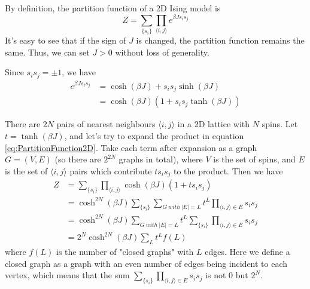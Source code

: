 \documentclass[11pt]{article}
\begin{document}
	By definition, the partition function of a 2D Ising model is
	\begin{equation} \label{eq:PartitionFunction2D}
		Z = \sum_{\{s_i\}} \prod_{\langle i,j \rangle} e^{\beta J s_i s_j}
	\end{equation}
	It's easy to see that if the sign of $J$ is changed, the partition function remains the same.
	Thus, we can set $J > 0$ without loss of generality.

	Since $s_i s_j = \pm 1$, we have
	\begin{equation} \label{eq:PartitionFunction2DTransformingTrick}
		\begin{aligned}
			e^{\beta J s_i s_j} &= \cosh(\beta J) + s_i s_j \sinh(\beta J) \\
			&= \cosh(\beta J)(1 + s_i s_j \tanh(\beta J))
		\end{aligned}
	\end{equation}

	There are $2N$ pairs of nearest neighbours $\langle i,j \rangle$ in a 2D lattice with $N$ spins.
	Let $t = \tanh(\beta J)$, and let's try to expand the product in equation \eqref{eq:PartitionFunction2D}.
	Take each term after expansion as a graph $G = (V, E)$ (so there are $2^{2N}$ graphs in total), 
	where $V$ is the set of spins, 
	and $E$ is the set of $\langle i,j \rangle$ pairs which contribute $t s_i s_j$ to the product.
	Then we have
	\begin{equation} \label{eq:PartitionFunction2DTransformed}
		\begin{aligned}
			Z &= \sum_{\{s_i\}} \prod_{\langle i,j \rangle} \cosh(\beta J)(1 + t s_i s_j) \\
			&= \cosh^{2N}(\beta J) \sum_{\{s_i\}} \sum_{G\ with\ |E|=L} t^L \prod_{\langle i,j \rangle \in E} s_i s_j \\
			&= \cosh^{2N}(\beta J) \sum_{G\ with\ |E|=L} t^L \sum_{\{s_i\}} \prod_{\langle i,j \rangle \in E} s_i s_j \\
			&= 2^N \cosh^{2N}(\beta J) \sum_{L} t^L f(L)
		\end{aligned}
	\end{equation}
	where $f(L)$ is the number of "closed graphs" with $L$ edges.
	Here we define a closed graph as a graph with an even number of edges being incident to each vertex, 
	which means that the sum $\sum_{\{s_i\}} \prod_{\langle i,j \rangle \in E} s_i s_j$ is not $0$ but $2^N$.
\end{document}
